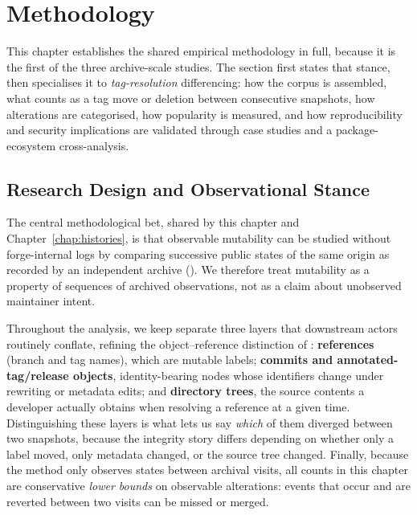 \section{Methodology}
\label{sec:tags-methodology}

This chapter establishes the shared empirical methodology in full, because it is the first of the three archive-scale studies.%
The section first states that stance, then specialises it to \emph{tag-resolution} differencing: how the corpus is assembled, what counts as a tag move or deletion between consecutive snapshots, how alterations are categorised, how popularity is measured, and how reproducibility and security implications are validated through case studies and a package-ecosystem cross-analysis.

\subsection{Research Design and Observational Stance}
\label{subsec:tags-research-design}

The central methodological bet, shared by this chapter and Chapter~\ref{chap:histories}, is that observable mutability can be studied without forge-internal logs by comparing successive public states of the same origin as recorded by an independent archive ().
We therefore treat mutability as a property of sequences of archived observations, not as a claim about unobserved maintainer intent.

Throughout the analysis, we keep separate three layers that downstream actors routinely conflate, refining the object--reference distinction of : \textbf{references} (branch and tag names), which are mutable labels; \textbf{commits and annotated-tag/release objects}, identity-bearing nodes whose identifiers change under rewriting or metadata edits; and \textbf{directory trees}, the source contents a developer actually obtains when resolving a reference at a given time.
Distinguishing these layers is what lets us say \emph{which} of them diverged between two snapshots, because the integrity story differs depending on whether only a label moved, only metadata changed, or the source tree changed.
Finally, because the method only observes states between archival visits, all counts in this chapter are conservative \emph{lower bounds} on observable alterations: events that occur and are reverted between two visits can be missed or merged.

